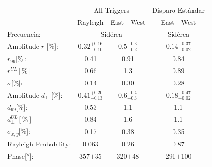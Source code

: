 \documentclass[11pt, letterpaper,oneside]{article}
\begin{document}
\begin{table}[H]
    \vspace*{-0.51 cm}
    \begin{small}
        \begin{center}
            \begin{tabular}[c]{l|c|c||c|}
                \cline{2-4}                 & \multicolumn{2}{c||}{All Triggers}                  & Disparo Estándar      \\
                \cline{2-4}                 & Rayleigh                          & East - West                 & East - West\cite{Aab_2020}      \\\hline
\multicolumn{1}{|l|}{Frecuencia:             }  & \multicolumn{2}{c||}{Sidérea}                               & Sidérea        \\ \hline
\multicolumn{1}{|l|}{Amplitude $r$ [\%]:      }  & $0.32^{+0.16}_{-0.10}$ 	    & $0.5^{+0.3}_{-0.2}$         & $0.14^{+0.37}_{-0.02}$\cite{codigo}       \\
\multicolumn{1}{|l|}{$r_{99}$[\%]:           }  & 0.41	                        & 0.91                        & 0.84\cite{codigo}        \\
\multicolumn{1}{|l|}{$r^{UL}[\%]$      }        & 0.66                          & 1.3                         & 0.89 \cite{codigo}        \\
\multicolumn{1}{|l|}{$\sigma$[\%]:     }        & 0.14                          & 0.30	                    & 0.28 \cite{codigo}          \\ \hline
\multicolumn{1}{|l|}{Amplitude $d_\perp$ [\%]:}  & $0.41^{+0.20}_{-0.13}$        & $0.6^{+0.4}_{-0.3}$         & $0.18^{+0.47}_{-0.02}$       \\ 
\multicolumn{1}{|l|}{$d_{99}$[\%]:           }  & 0.53	                       & 1.1                         & 1.1\cite{codigo}        \\
\multicolumn{1}{|l|}{$d_{\perp}^{UL}[\%]$    }  & 0.84                          & 1.6                         & 1.1        \\
\multicolumn{1}{|l|}{$\sigma_{x,y}$[\%]:     }  & 0.17                          & 0.38	                    & 0.35          \\ \hline
\multicolumn{1}{|l|}{Rayleigh Probability:           }  & 0.063	                           & 0.26                        & 0.87          \\
\multicolumn{1}{|l|}{Phase[$^o$]:             }  & 357$\pm$35                   & 320$\pm$48                 & 291$\pm$100      \\\hline

\end{tabular}
\end{center}
\end{small}
\end{table}
\end{document}
